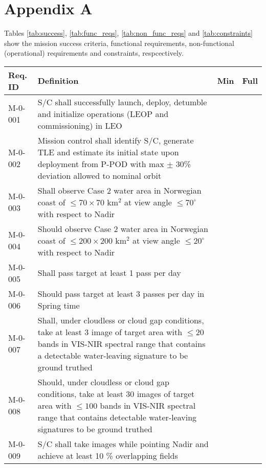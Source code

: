 \section{Appendix A}
Tables \ref{tab:success}, \ref{tab:func_reqs}, \ref{tab:non_func_reqs} and \ref{tab:constraints} show the mission success criteria, functional requirements, non-functional (operational) requirements and constraints, respcectively.
\begin{table*}[htbp]
	\label{tab:success}
	\caption{Mission Success Criteria}
	\centering
		\begin{tabular}{l p{12cm} c c}
			\hline
			Req. ID & \textbf{Definition} &	Min & Full	\\ 
			\hline 				
			M-0-001 & S/C shall successfully launch, deploy, detumble and initialize operations (LEOP and commissioning) in LEO & \checkmark &  \\
			\hline														
			M-0-002 & Mission control shall identify S/C, generate TLE and estimate its initial state upon deployment from P-POD with max $\pm$ 30\% deviation allowed to nominal orbit & \checkmark &  \\
			\hline
			M-0-003 & Shall observe Case 2 water area in Norwegian coast of $\leq 70 \times 70$ km$^2$ at view angle $\leq 70^{\circ}$ with respect to Nadir  & \checkmark &  \\
			\hline
			M-0-004 & Should observe Case 2 water area in Norwegian coast of $\leq 200 \times 200$ km$^2$ at view angle $\leq 20^{\circ}$ with respect to Nadir  &  & \checkmark \\
			\hline
			M-0-005 & Shall pass target at least 1 pass per day & \checkmark & \\
			\hline
			M-0-006 & Should pass target at least 3 passes per day in Spring time &  & \checkmark \\
			\hline
			M-0-007 & Shall, under cloudless or cloud gap conditions, take at least 3 image of target area with $\leq 20$ bands in VIS-NIR spectral range that contains a detectable water-leaving signature to be ground truthed & \checkmark &  \\
			\hline
			M-0-008 & Should, under cloudless or cloud gap conditions, take at least 30 images of target area with $\leq 100$ bands in VIS-NIR spectral range that contains detectable water-leaving signatures to be ground truthed & & \checkmark \\
			\hline
			M-0-009 & S/C shall take images while pointing Nadir and achieve at least 10 \% overlapping fields & \checkmark &  \\

\end{tabular}
\end{table*}
